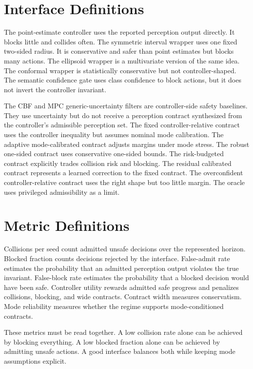 \documentclass{article}
\begin{document}
\clearpage
\section{Interface Definitions}

The point-estimate controller uses the reported perception output directly. It blocks little and collides often. The symmetric interval wrapper uses one fixed two-sided radius. It is conservative and safer than point estimates but blocks many actions. The ellipsoid wrapper is a multivariate version of the same idea. The conformal wrapper is statistically conservative but not controller-shaped. The semantic confidence gate uses class confidence to block actions, but it does not invert the controller invariant.

The CBF and MPC generic-uncertainty filters are controller-side safety baselines. They use uncertainty but do not receive a perception contract synthesized from the controller's admissible perception set. The fixed controller-relative contract uses the controller inequality but assumes nominal mode calibration. The adaptive mode-calibrated contract adjusts margins under mode stress. The robust one-sided contract uses conservative one-sided bounds. The risk-budgeted contract explicitly trades collision risk and blocking. The residual calibrated contract represents a learned correction to the fixed contract. The overconfident controller-relative contract uses the right shape but too little margin. The oracle uses privileged admissibility as a limit.

\section{Metric Definitions}

Collisions per seed count admitted unsafe decisions over the represented horizon. Blocked fraction counts decisions rejected by the interface. False-admit rate estimates the probability that an admitted perception output violates the true invariant. False-block rate estimates the probability that a blocked decision would have been safe. Controller utility rewards admitted safe progress and penalizes collisions, blocking, and wide contracts. Contract width measures conservatism. Mode reliability measures whether the regime supports mode-conditioned contracts.

These metrics must be read together. A low collision rate alone can be achieved by blocking everything. A low blocked fraction alone can be achieved by admitting unsafe actions. A good interface balances both while keeping mode assumptions explicit.
\end{document}
